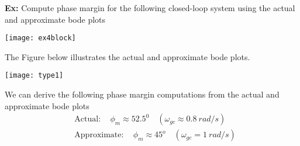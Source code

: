 \documentclass[twoside]{article}
\begin{document}
\textbf{Ex:} Compute  phase margin for the following closed-loop system 
using the actual and approximate bode plots

\begin{center}
\begin{minipage}[h]{\linewidth}
    \begin{center}
      \texttt{[image: ex4block]}
    \end{center}
\end{minipage}
\end{center}

The Figure below illustrates the actual and approximate bode plots.

\begin{minipage}[h]{1\linewidth}
    \begin{center}
      \texttt{[image: type1]}
    \end{center}
\end{minipage}

We can derive the following phase margin computations from the
actual and approximate bode plots
%
%
\begin{align*}
	&\mathrm{Actual:} \quad \phi_m \approx 52.5^0 \quad (\omega_{gc} \approx 0.8 \ rad/s)
	\\
	&\mathrm{Approximate:} \quad \phi_m \approx 45^o \quad (\omega_{gc} = 1 \ rad/s)
\end{align*}
%



\end{document}

